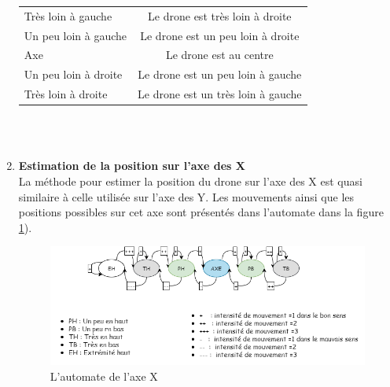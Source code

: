 \documentclass[12pt]{article}
\begin{document}
\begin{enumerate}
\begin{tabular}{|l|c|}
            \hline
            Très loin à gauche & Le drone est très loin à droite  \\
            Un peu loin à gauche & Le drone est un peu loin à droite \\
            Axe & Le drone est au centre \\
            Un peu loin à droite & Le drone est un peu loin à gauche \\
            Très loin à droite & Le drone est un très loin à gauche \\
            \hline
            \end{tabular}\\\\

            
        \item \textbf{Estimation de la position sur l’axe des X }\\
            La méthode pour estimer la position du drone sur l’axe des X est quasi similaire à celle utilisée sur l’axe des Y. 
            Les mouvements ainsi que les positions possibles sur cet axe sont présentés dans l’automate dans la figure \ref{fig:axeX}).\\
            \begin{figure}[H]
            \centering
            \includegraphics[height=4cm]{axeX.png}
            \caption{L'automate de l'axe X}
            \label{fig:axeX}
            \end{figure}
        

\end{enumerate}
\end{document}
